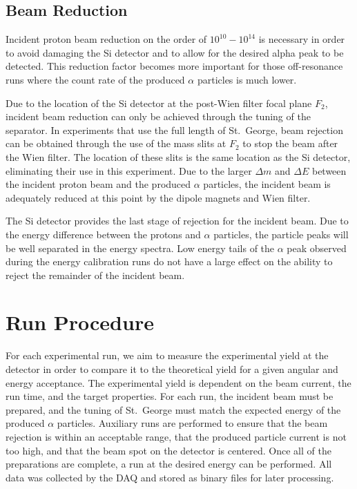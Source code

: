 \subsection{Beam Reduction}


Incident proton beam reduction on the order of $10^{10} - 10^{14}$ is
necessary in order to avoid damaging the Si detector and to allow for
the desired alpha peak to be detected. This reduction factor becomes
more important for those off-resonance runs where the count rate of the
produced $\alpha$ particles is much lower.

Due to the location of the Si detector at the post-Wien filter focal
plane $F_2$, incident beam reduction can only be achieved through the
tuning of the separator. In experiments that use the full length of
St.\ George, beam rejection can be obtained through the use of the mass
slits at $F_2$ to stop the beam after the Wien filter. The location of
these slits is the same location as the Si detector, eliminating their
use in this experiment. Due to the larger $\Delta m$ and $\Delta E$
between the incident proton beam and the produced $\alpha$ particles,
the incident beam is adequately reduced at this point by the dipole
magnets and Wien filter.

The Si detector provides the last stage of rejection for the incident
beam. Due to the energy difference between the protons and $\alpha$
particles, the particle peaks will be well separated in the energy
spectra. Low energy tails of the $\alpha$ peak observed during the
energy calibration runs do not have a large effect on the ability to
reject the remainder of the incident beam.


\section{Run Procedure}

For each experimental run, we aim to measure the experimental yield at
the detector in order to compare it to the theoretical yield for a given
angular and energy acceptance. The experimental yield is dependent on
the beam current, the run time, and the target properties. For each run,
the incident beam must be prepared, and the tuning of St.\ George must
match the expected energy of the produced $\alpha$ particles. Auxiliary
runs are performed to ensure that the beam rejection is within an
acceptable range, that the produced particle current is not too high,
and that the beam spot on the detector is centered. Once all of the
preparations are complete, a run at the desired energy can be performed.
All data was collected by the DAQ and stored as binary files for later
processing.

